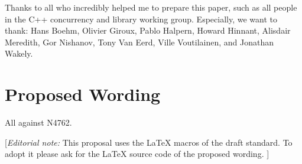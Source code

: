 Thanks to all who incredibly helped me to prepare this paper, such as all people in the C++ concurrency and library working group.
Especially, we want to thank:
 Hans Boehm, Olivier Giroux, Pablo Halpern, Howard Hinnant, Alisdair Meredith, Gor Nishanov,
 Tony Van Eerd, Ville Voutilainen, and Jonathan Wakely.


\section*{Proposed Wording}
All against N4762.

{\color{blue}
[{\itshape{}Editorial note:} This proposal uses the LaTeX macros of the draft standard.
        To adopt it please ask for the LaTeX source code of the proposed wording. ]
}

\clearpage

